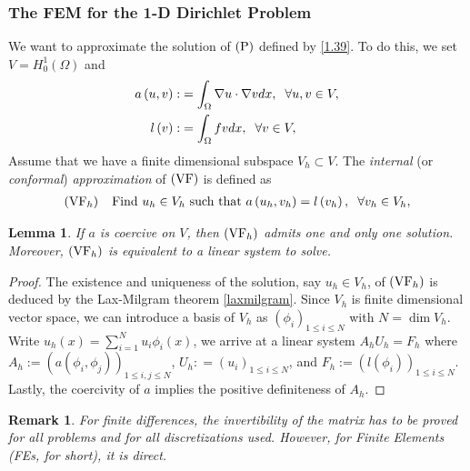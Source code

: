 \documentclass[11pt,a4paper,center,notitlepage]{article}
\numberwithin{equation}{section}
\newtheorem{lemma}{Lemma}[section]
\newtheorem{remark}{Remark}[section]
\begin{document}
\subsubsection{The FEM for the 1-D Dirichlet Problem}
We want to approximate the solution of $\left( {\rm P}\right)$ defined by \eqref{1.39}. To do this, we set $V = H_0^1\left( \Omega  \right)$ and
\begin{align}
a\left( {u,v} \right):&= \int_\Omega  {\nabla u \cdot \nabla vdx} ,\hspace{2mm}\forall u,v \in V,\\
l\left( v \right):&= \int_\Omega  {fvdx} ,\hspace{2mm}\forall v \in V,
\end{align}
Assume that we have a finite dimensional subspace $V_h \subset V$. The \textit{internal} (or \textit{conformal}) \textit{approximation} of $\left( {\rm VF} \right)$ is defined as 
\begin{align}
\left( {\rm VF}_h \right) \hspace{2mm} \mbox{ Find }{u_h} \in {V_h} \mbox{ such that } a\left( {{u_h},{v_h}} \right) = l\left( {{v_h}} \right),\hspace{2mm}\forall {v_h} \in {V_h},
\end{align}

\begin{lemma}
If $a$ is coercive on $V$, then $\left( {\rm VF}_h \right)$ admits one and only one solution. Moreover, $\left( {\rm VF}_h \right)$ is equivalent to a linear system to solve.
\end{lemma}

\begin{proof}
The existence and uniqueness of the solution, say $u_h\in V_h$, of $\left( {\rm VF}_h \right)$ is deduced by the Lax-Milgram theorem \ref{laxmilgram}. Since $V_h$ is finite dimensional vector space, we can introduce a basis of $V_h$ as ${\left( {{\phi _i}} \right)_{1 \le i \le N}}$ with $N= \dim V_h$. Write ${u_h}\left( x \right) = \sum\nolimits_{i = 1}^N {{u_i}{\phi _i}\left( x \right)} $, we arrive at a linear system $A_h U_h =F_h$ where ${A_h} := {\left( {a\left( {{\phi _i},{\phi _j}} \right)} \right)_{1 \le i,j \le N}}$, ${U_h}: = {\left( {{u_i}} \right)_{1 \le i \le N}}$, and ${F_h} := {\left( {l\left( {{\phi _i}} \right)} \right)_{1 \le i \le N}}$. Lastly, the coercivity of $a$ implies the positive definiteness of $A_h$.
\end{proof}

\begin{remark}
For finite differences, the invertibility of the matrix has to be proved for all problems and for all discretizations used. However, for Finite Elements (FEs, for short), it is direct.
\end{remark}
\end{document}

